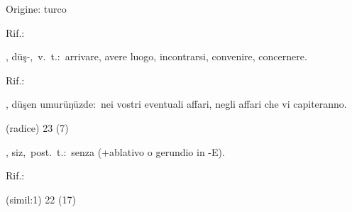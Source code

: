 \begin{glossario}{Origine: turco}
\begin{subvocedue}
\item[Rif.:] 
\end{subvocedue}
\item[{\color{colorlowref}\spzrl{d.U^sB}},] {\sf düş-},\ v.\ t.:\ arrivare, avere luogo, incontrarsi, convenire, concernere.
\begin{subvocedue}
\item[Rif.:] 
\end{subvocedue}
\begin{subvocedue}
\item[\subglossariobullet] , {\sf düşen umurüŋüzde}:\ nei vostri eventuali affari, negli affari che vi capiteranno.
\item[(radice)]   23 (7)
\end{subvocedue}
\item[{\color{colorlowref}\spzrl{siz}},] {\sf siz},\ post.\ t.:\ senza (+ablativo o gerundio in -E).
\begin{subvocedue}
\item[Rif.:] 
\end{subvocedue}
\begin{subvocedue}
\item[(simil:1)]   22 (17)
\end{subvocedue}



\end{glossario}
